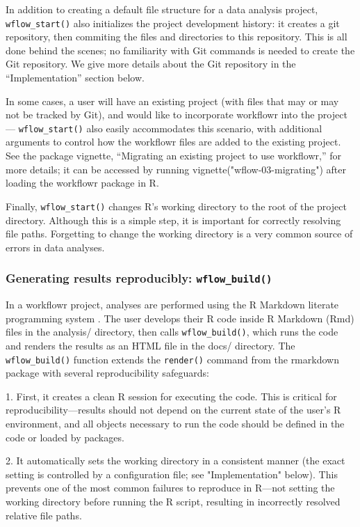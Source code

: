 \documentclass[9pt,a4paper]{extarticle}
\begin{document}
In addition to creating a default file structure for a data analysis
project, \texttt{wflow\_start()} also initializes the project development history:
it creates a git repository, then commiting the files and directories to
this repository. This is all done behind the scenes; no familiarity with
Git commands is needed to create the Git repository. We give more
details about the Git repository in the “Implementation” section below.

In some cases, a user will have an existing project (with files that may
or may not be tracked by Git), and would like to incorporate workflowr
into the project --- \texttt{wflow\_start()} also easily accommodates this
scenario, with additional arguments to control how the workflowr files
are added to the existing project. See the package vignette, “Migrating
an existing project to use workflowr,” for more details; it can be
accessed by running vignette("wflow-03-migrating") after loading the
workflowr package in R.

Finally, \texttt{wflow\_start()} changes R’s working directory to the root of the
project directory. Although this is a simple step, it is important for
correctly resolving file paths. Forgetting to change the working
directory is a very common source of errors in data analyses.

\subsubsection*{Generating results reproducibly: \texttt{wflow\_build()}}

In a workflowr project, analyses are performed using the R Markdown
literate programming system \cite{Xie2018}. The user develops their R
code inside R Markdown (Rmd) files in the analysis/ directory, then
calls \texttt{wflow\_build()}, which runs the code and renders the results as an
HTML file in the docs/ directory. The \texttt{wflow\_build()} function extends the
\texttt{render()} command from the rmarkdown package with several reproducibility
safeguards:

1. First, it creates a clean R session for executing the code. This is
critical for reproducibility—results should not depend on the current
state of the user's R environment, and all objects necessary to run the
code should be defined in the code or loaded by packages.

2. It automatically sets the working directory in a consistent manner
(the exact setting is controlled by a configuration file; see
"Implementation" below). This prevents one of the most common failures
to reproduce in R—not setting the working directory before running the R
script, resulting in incorrectly resolved relative file paths.
\end{document}
